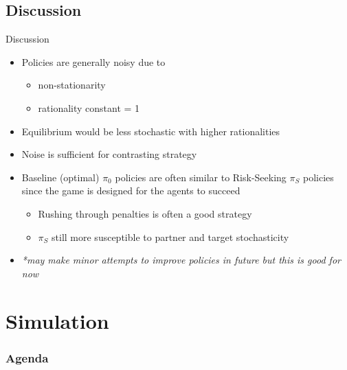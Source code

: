 \documentclass[aspectratio=1610, xcolor=dvipsnames]{packages/beamer}
\newcommand{\displayTOC}{\begin{frame}\frametitle{Agenda} \tableofcontents[currentsection, subsectionstyle=show/show/hide]\end{frame}}
\begin{document}
\subsection{Discussion}\label{subsec:discussion}\begin{frame}{Discussion}
\begin{itemize}
    \item Policies are generally noisy due to
    \begin{itemize}
        \item non-stationarity
        \item rationality constant = 1
    \end{itemize}
    \item Equilibrium would be less stochastic with higher rationalities
    \item Noise is sufficient for contrasting strategy   
    \item Baseline (optimal) $\pi_0$ policies are often similar to Risk-Seeking $\pi_S$ policies since the game is designed for the agents to succeed
    \begin{itemize}
        \item Rushing through penalties is often a good strategy
        \item $\pi_S$ still more susceptible to partner and target stochasticity
    \end{itemize}
    \item \textit{*may make minor attempts to improve policies in future but this is good for now}
\end{itemize}
\end{frame}
\section{Simulation}\label{sec:simulation} \displayTOC
\end{document}
